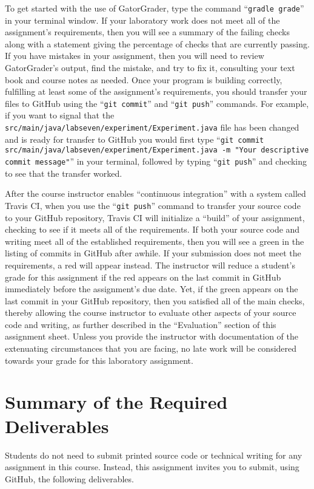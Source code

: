\documentclass[11pt]{article}
\newcommand{\mainprogramsource}{\lstinline{src/main/java/labseven/experiment/Experiment.java}}
\newcommand{\gatorgraderstart}{\command{gradle grade}}
\newcommand{\gitcommit}{\command{git commit}}
\newcommand{\gitpush}{\command{git push}}
\newcommand{\gitcommitmainprogram}{\command{git commit src/main/java/labseven/experiment/Experiment.java -m "Your
descriptive commit message"}}
\newcommand{\command}[1]{``\lstinline{#1}''}
\newcommand{\step}[1]{``{#1}''}
\newcommand{\checkmark}{\ding{51}}
\newcommand{\naughtmark}{\ding{55}}
\begin{document}
To get started with the use of GatorGrader, type the command \gatorgraderstart{}
in your terminal window. If your laboratory work does not meet all of the
assignment's requirements, then you will see a summary of the failing checks
along with a statement giving the percentage of checks that are currently
passing. If you have mistakes in your assignment, then you will need to review
GatorGrader's output, find the mistake, and try to fix it, consulting your text
book and course notes as needed. Once your program is building correctly,
fulfilling at least some of the assignment's requirements, you should transfer
your files to GitHub using the \gitcommit{} and \gitpush{} commands. For
example, if you want to signal that the \mainprogramsource{} file has been
changed and is ready for transfer to GitHub you would first type
\gitcommitmainprogram{} in your terminal, followed by typing \gitpush{} and
checking to see that the transfer worked.

After the course instructor enables \step{continuous integration} with a system
called Travis CI, when you use the \gitpush{} command to transfer your source
code to your GitHub repository, Travis CI will initialize a \step{build} of your
assignment, checking to see if it meets all of the requirements. If both your
source code and writing meet all of the established requirements, then you will
see a green \checkmark{} in the listing of commits in GitHub after awhile. If
your submission does not meet the requirements, a red \naughtmark{} will appear
instead. The instructor will reduce a student's grade for this assignment if the
red \naughtmark{} appears on the last commit in GitHub immediately before the
assignment's due date. Yet, if the green \checkmark{} appears on the last commit
in your GitHub repository, then you satisfied all of the main checks, thereby
allowing the course instructor to evaluate other aspects of your source code and
writing, as further described in the \step{Evaluation} section of this
assignment sheet. Unless you provide the instructor with documentation of the
extenuating circumstances that you are facing, no late work will be considered
towards your grade for this laboratory assignment.

\section*{Summary of the Required Deliverables}

\noindent Students do not need to submit printed source code or technical
writing for any assignment in this course. Instead, this assignment invites you
to submit, using GitHub, the following deliverables.
\end{document}
